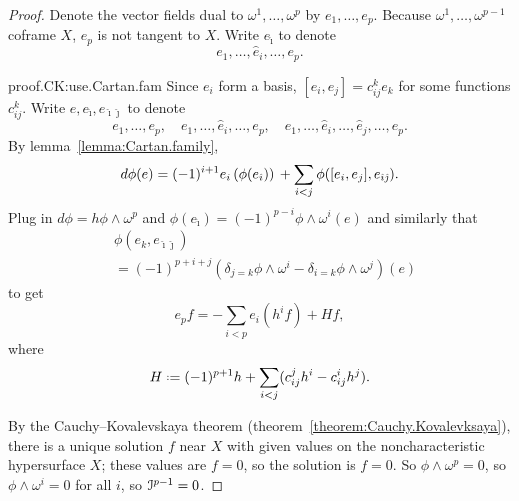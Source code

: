 \begin{proof}
Denote the vector fields dual to \(\omega^1,\dots,\omega^p\) by \(e_1,\dots,e_p\).
Because \(\omega^1,\dots,\omega^{p-1}\) coframe \(X\), \(e_p\) is not tangent to \(X\).
Write \(e_{\hat\imath}\) to denote 
\[
e_1,\dots,\hat{e}_i,\dots,e_p.
\]
\begin{answer}{proof.CK:use.Cartan.fam}
Since \(e_i\) form a basis, \([e_i,e_j]=c_{ij}^k e_k\) for some functions \(c^k_{ij}\).
Write \(e,e_{\hat\imath}, e_{\hat\imath\hat\jmath}\) to denote 
\[
e_1,\dots,e_p, \quad e_1,\dots,\hat{e}_i,\dots,e_p, \quad e_1,\dots,\hat{e}_i,\dots,\hat{e}_j,\dots,e_p.
\]
By lemma~\vref{lemma:Cartan.family},
\[
d\phi(e)
=
(-1)^{i+1}e_i\left(\phi(e_{\hat\imath})\right)\\
+
\sum_{i < j} \phi([e_i,e_j],e_{\hat\imath\hat\jmath}).
\]
Plug in \(d\phi=h\phi\wedge\omega^p\) and \(\phi(e_{\hat\imath})=(-1)^{p-i}\phi\wedge\omega^i(e)\) and similarly that
\begin{align*}
&\phi(e_k,e_{\hat\imath\hat\jmath})\\
&=(-1)^{p+i+j}
\left(
\delta_{j=k}
\phi\wedge\omega^i
-
\delta_{i=k}
\phi\wedge\omega^j
\right)(e)
\end{align*}
to get
\[
e_p f = - \sum_{i < p} e_i( h^i f) + Hf,
\]
where
\[
H\defeq(-1)^{p+1}h 
+
\sum_{i<j}(c^j_{ij}h^i-c^i_{ij}h^j).
\]
\end{answer}
By the Cauchy--Kovalevskaya theorem (theorem~\vref{theorem:Cauchy.Kovalevksaya}), there is a unique solution \(f\) near \(X\) with given values on the noncharacteristic hypersurface \(X\); these values are \(f=0\), so the solution is \(f=0\).
So \(\phi\wedge\omega^p=0\), so \(\phi\wedge \omega^i=0\) for all \(i\), so \(\mathcal{I}^{p-1}=0\).
\end{proof}
